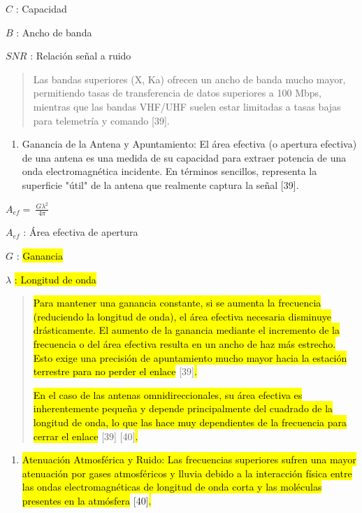 \documentclass[12pt,a4paper]{article}
\begin{document}
\(C\) : Capacidad

\(B\) : Ancho de banda

\(SNR\) : Relación señal a ruido

\begin{quote}
Las bandas superiores (X, Ka) ofrecen un ancho de banda mucho mayor, permitiendo tasas de transferencia de datos superiores a 100 Mbps, mientras que las bandas VHF/UHF suelen estar limitadas a tasas bajas para telemetría y comando {[}39{]}.
\end{quote}

\begin{enumerate}
\def\labelenumi{\arabic{enumi}.}
\setcounter{enumi}{2}
\item
  Ganancia de la Antena y Apuntamiento: El área efectiva (o apertura efectiva) de una antena es una medida de su capacidad para extraer potencia de una onda electromagnética incidente. En términos sencillos, representa la superficie "útil" de la antena que realmente captura la señal {[}39{]}.
\end{enumerate}

\(A_{ef} = \ \frac{G\lambda^{2}}{4\pi}\)

\(A_{ef}\) : Área efectiva de apertura

\(G\) : \hl{Ganancia}

\hl{}\(\lambda\) \hl{: Longitud de onda}

\begin{quote}
\hl{Para mantener una ganancia constante, si se aumenta la frecuencia (reduciendo la longitud de onda), el área efectiva necesaria disminuye drásticamente. El aumento de la ganancia mediante el incremento de la frecuencia o del área efectiva resulta en un ancho de haz más estrecho. Esto exige una precisión de apuntamiento mucho mayor hacia la estación terrestre para no perder el enlace} {[}39{]}\hl{.}

\hl{En el caso de las antenas omnidireccionales, su área efectiva es inherentemente pequeña y depende principalmente del cuadrado de la longitud de onda, lo que las hace muy dependientes de la frecuencia para cerrar el enlace} {[}39{]} \hl{}{[}40{]}\hl{.}
\end{quote}

\begin{enumerate}
\def\labelenumi{\arabic{enumi}.}
\setcounter{enumi}{3}
\item
  \hl{Atenuación Atmosférica y Ruido: Las frecuencias superiores sufren una mayor atenuación por gases atmosféricos y lluvia debido a la interacción física entre las ondas electromagnéticas de longitud de onda corta y las moléculas presentes en la atmósfera} {[}40{]}\hl{.}
\end{enumerate}
\end{document}
